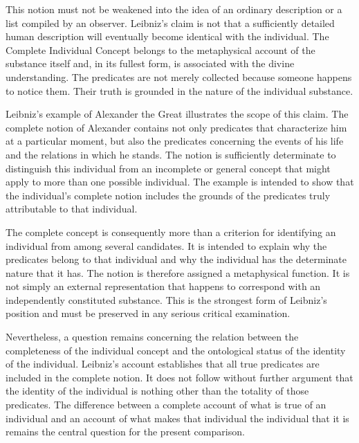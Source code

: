 \label{para:VS.B01.P01.C08.S07.SS05.P002}

This notion must not be weakened into the idea
of an ordinary description or a list compiled
by an observer. Leibniz's claim is not that
a sufficiently detailed human description
will eventually become identical with the
individual. The Complete Individual Concept
belongs to the metaphysical account of the
substance itself and, in its fullest form,
is associated with the divine understanding.
The predicates are not merely collected because
someone happens to notice them. Their truth
is grounded in the nature of the individual
substance. \cite[§8]{LeibnizDiscourse}
\cite{LookLeibnizSEP2020}

\label{para:VS.B01.P01.C08.S07.SS05.P003}

Leibniz's example of Alexander the Great illustrates
the scope of this claim. The complete notion
of Alexander contains not only predicates
that characterize him at a particular moment,
but also the predicates concerning the events
of his life and the relations in which he
stands. The notion is sufficiently determinate
to distinguish this individual from an
incomplete or general concept that might
apply to more than one possible individual.
The example is intended to show that the
individual's complete notion includes the
grounds of the predicates truly attributable
to that individual. \cite[§8]{LeibnizDiscourse}

\label{para:VS.B01.P01.C08.S07.SS05.P004}

The complete concept is consequently more than
a criterion for identifying an individual
from among several candidates. It is intended
to explain why the predicates belong to that
individual and why the individual has the
determinate nature that it has. The notion
is therefore assigned a metaphysical function.
It is not simply an external representation
that happens to correspond with an independently
constituted substance. This is the strongest
form of Leibniz's position and must be preserved
in any serious critical examination. \cite{LookLeibnizSEP2020}

\label{para:VS.B01.P01.C08.S07.SS05.P005}

Nevertheless, a question remains concerning
the relation between the completeness of the
individual concept and the ontological status
of the identity of the individual. Leibniz's
account establishes that all true predicates
are included in the complete notion. It does
not follow without further argument that the
identity of the individual is nothing other
than the totality of those predicates. The
difference between a complete account of
what is true of an individual and an account
of what makes that individual the individual
that it is remains the central question
for the present comparison.


